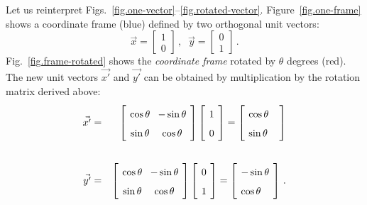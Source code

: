 Let us reinterpret Figs.~\ref{fig.one-vector}--\ref{fig.rotated-vector}. Figure~\ref{fig.one-frame} shows a coordinate frame (blue) defined by two orthogonal unit vectors:
\[
\vec{x}= \left[\begin{array}{c}1\\0\end{array}\right]\,,\;\;
\vec{y}= \left[\begin{array}{c}0\\1\end{array}\right]\,.
\]
Fig.~\ref{fig.frame-rotated} shows the \emph{coordinate frame} rotated by $\theta$ degrees (red). The new unit vectors $\vec{x'}$ and $\vec{y'}$ can be obtained by multiplication by the rotation matrix derived above:
\begin{eqnarray*}
\vec{x'}&=&
\left[\spacearray\begin{array}{cc}\cos\theta&-\sin\theta\\\sin\theta&\cos\theta\end{array}\right]
\left[\spacearray\begin{array}{c}1\\0\end{array}\right]=
\left[\spacearray\begin{array}{l}\cos \theta\\\sin\theta\;\;\:\end{array}\right]\\
\,\\
\vec{y'}&=&
\left[\spacearray\begin{array}{cc}\cos\theta&-\sin\theta\\\sin\theta&\cos\theta\end{array}\right]
\left[\spacearray\begin{array}{c}0\\1\end{array}\right]=
\left[\spacearray\begin{array}{l}-\sin \theta\\\cos\theta\end{array}\right]\,.
\end{eqnarray*}
